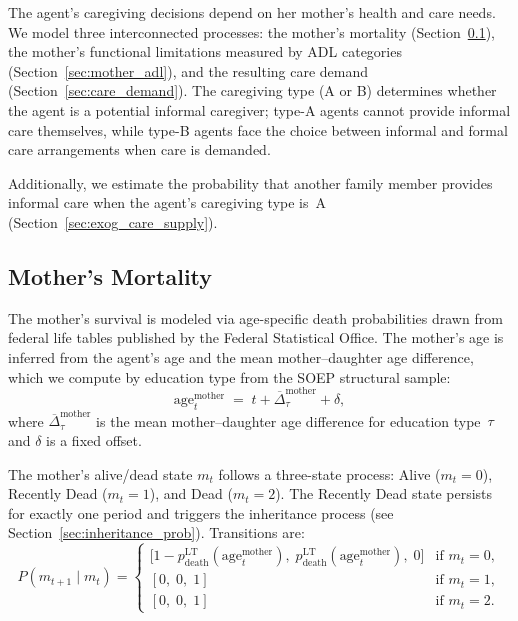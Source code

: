 The agent's caregiving decisions depend on her mother's health and care
needs.  We model three interconnected processes: the mother's mortality
(Section~\ref{sec:mother_mortality}), the mother's functional limitations
measured by ADL categories (Section~\ref{sec:mother_adl}), and the
resulting care demand (Section~\ref{sec:care_demand}).  The caregiving type
(A or B) determines whether the agent is a potential informal caregiver;
type-A agents cannot provide informal care themselves, while type-B agents
face the choice between informal and formal care arrangements when care is
demanded.

Additionally, we estimate the probability that another family member
provides informal care when the agent's caregiving type is~A
(Section~\ref{sec:exog_care_supply}).


\subsection{Mother's Mortality}
\label{sec:mother_mortality}

The mother's survival is modeled via age-specific death probabilities drawn
from federal life tables published by the Federal Statistical Office.  The
mother's age is inferred from the agent's age and the mean
mother--daughter age difference, which we compute by education type from
the SOEP structural sample:
\begin{equation}
  \text{age}^{\text{mother}}_{t}
  \;=\; t + \overline{\Delta}_{\tau}^{\text{mother}} + \delta,
  \label{eq:mother_age}
\end{equation}
where $\overline{\Delta}_{\tau}^{\text{mother}}$ is the mean
mother--daughter age difference for education type~$\tau$ and $\delta$ is a
fixed offset.

The mother's alive/dead state $m_t$ follows a three-state process: Alive
($m_t = 0$), Recently Dead ($m_t = 1$), and Dead ($m_t = 2$).  The
Recently Dead state persists for exactly one period and triggers the
inheritance process (see Section~\ref{sec:inheritance_prob}).  Transitions
are:
\begin{equation}
  P(m_{t+1} \mid m_t) =
  \begin{cases}
    \bigl[1 - p^{\text{LT}}_{\text{death}}(\text{age}^{\text{mother}}_t),\;
           p^{\text{LT}}_{\text{death}}(\text{age}^{\text{mother}}_t),\; 0\bigr]
    & \text{if } m_t = 0, \\[4pt]
    [0,\; 0,\; 1] & \text{if } m_t = 1, \\[4pt]
    [0,\; 0,\; 1] & \text{if } m_t = 2.
  \end{cases}
  \label{eq:mother_death_transition}
\end{equation}

